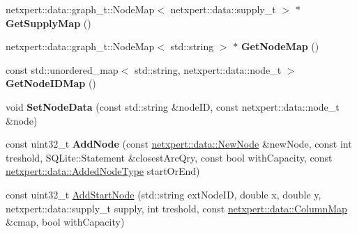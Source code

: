 \begin{DoxyCompactItemize}
\item 
netxpert\+::data\+::graph\+\_\+t\+::\+Node\+Map$<$ netxpert\+::data\+::supply\+\_\+t $>$ $\ast$ {\bfseries Get\+Supply\+Map} ()\hypertarget{classnetxpert_1_1InternalNet_aeb4a4e90f15e1006ada43f23ee84803c}{}\label{classnetxpert_1_1InternalNet_aeb4a4e90f15e1006ada43f23ee84803c}

\item 
netxpert\+::data\+::graph\+\_\+t\+::\+Node\+Map$<$ std\+::string $>$ $\ast$ {\bfseries Get\+Node\+Map} ()\hypertarget{classnetxpert_1_1InternalNet_a851f427a0c49e53dd5348e06e45b1dfe}{}\label{classnetxpert_1_1InternalNet_a851f427a0c49e53dd5348e06e45b1dfe}

\item 
const std\+::unordered\+\_\+map$<$ std\+::string, netxpert\+::data\+::node\+\_\+t $>$ {\bfseries Get\+Node\+I\+D\+Map} ()\hypertarget{classnetxpert_1_1InternalNet_a28a038378a7fda3a71cd336d7f907a8d}{}\label{classnetxpert_1_1InternalNet_a28a038378a7fda3a71cd336d7f907a8d}

\item 
void {\bfseries Set\+Node\+Data} (const std\+::string \&node\+ID, const netxpert\+::data\+::node\+\_\+t \&node)\hypertarget{classnetxpert_1_1InternalNet_aebd32a385c7273c478786becb9a86b95}{}\label{classnetxpert_1_1InternalNet_aebd32a385c7273c478786becb9a86b95}

\item 
const uint32\+\_\+t {\bfseries Add\+Node} (const \hyperlink{structnetxpert_1_1data_1_1NewNode}{netxpert\+::data\+::\+New\+Node} \&new\+Node, const int treshold, S\+Q\+Lite\+::\+Statement \&closest\+Arc\+Qry, const bool with\+Capacity, const \hyperlink{namespacenetxpert_1_1data_addf98eb51735356977db0de627cc38c1}{netxpert\+::data\+::\+Added\+Node\+Type} start\+Or\+End)\hypertarget{classnetxpert_1_1InternalNet_a4aa66e236aef1b675de6f9aa68c7fbc3}{}\label{classnetxpert_1_1InternalNet_a4aa66e236aef1b675de6f9aa68c7fbc3}

\item 
const uint32\+\_\+t \hyperlink{classnetxpert_1_1InternalNet_aae481644d03b116b8011b02f35f62a0f}{Add\+Start\+Node} (std\+::string ext\+Node\+ID, double x, double y, netxpert\+::data\+::supply\+\_\+t supply, int treshold, const \hyperlink{structnetxpert_1_1data_1_1ColumnMap}{netxpert\+::data\+::\+Column\+Map} \&cmap, bool with\+Capacity)\hypertarget{classnetxpert_1_1InternalNet_aae481644d03b116b8011b02f35f62a0f}{}\label{classnetxpert_1_1InternalNet_aae481644d03b116b8011b02f35f62a0f}


\end{DoxyCompactItemize}
